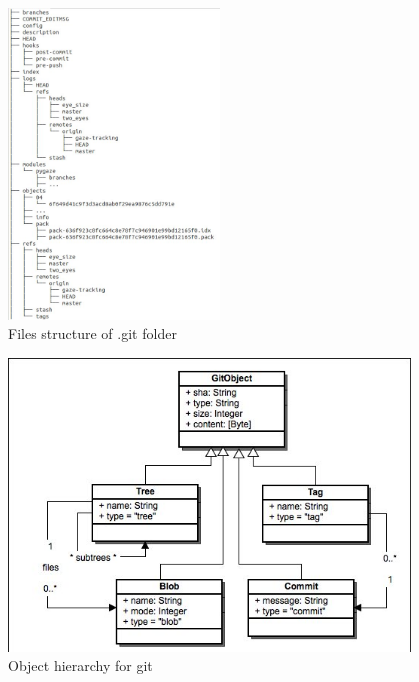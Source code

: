 \documentclass{article}
\begin{document}
\begin{figure}[htbp]
    \centering
    \includegraphics[width=0.5\textwidth]{filestructure.jpeg}
    \caption{Files structure of .git folder}
    \label{fig:file}
\end{figure}

\begin{figure}[htbp]
    \centering
    \includegraphics[width=0.95\textwidth]{objects.jpeg}
    \caption{Object hierarchy for git}
    \label{fig:objects}
\end{figure}
\end{document}
